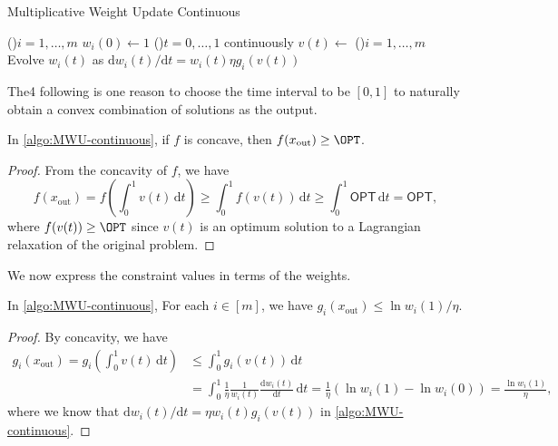 \begin{algorithm}[H]\label{algo:MWU-continuous}
	\DontPrintSemicolon{}
	\caption{Multiplicative Weight Update Continuous}
	\BlankLine

	\For(){\(i = 1, \dots , m\)}{
		\(w_i(0) \gets 1\)\;
	}
	\;
	\While(){\(t = 0, \dots , 1\) continuously}{
	\(v(t) \gets\)\;
	\For(){\(i = 1, \dots , m\)}{
		Evolve \(w_i(t)\) as \(\mathrm{d} w_i(t) / \mathrm{d} t = w_i(t) \eta g_i(v(t))\)\;
	}
	}
	\;
\end{algorithm}

The4 following is one reason to choose the time interval to be \([0, 1]\) to naturally obtain a convex combination of solutions as the output.

\begin{lemma}\label{lma:MWU-continuous-OPT}
	In \autoref{algo:MWU-continuous}, if \(f\) is concave, then \(f(x_{\text{out} }) \geq \OPT\).
\end{lemma}
\begin{proof}
	From the concavity of \(f\), we have
	\[
		f(x_{\text{out} })
		= f \left( \int_{0}^{1} v(t) \,\mathrm{d}t \right)
		\geq \int_{0}^{1} f(v(t)) \,\mathrm{d}t
		\geq \int_{0}^{1} \mathsf{OPT} \,\mathrm{d}t
		= \mathsf{OPT},
	\]
	where \(f(v(t)) \geq \OPT\) since \(v(t)\) is an optimum solution to a Lagrangian relaxation of the original problem.
\end{proof}

We now express the constraint values in terms of the weights.

\begin{lemma}\label{lma:MWU-continuous-constraint}
	In \autoref{algo:MWU-continuous}, For each \(i \in [m]\), we have \(g_i(x_{\text{out} }) \leq \ln w_i(1) / \eta \).
\end{lemma}
\begin{proof}
	By concavity, we have
	\[
		\begin{split}
			g_i(x_{\text{out} })
			= g_i \left( \int_{0}^{1} v(t) \,\mathrm{d}t \right)
			 & \leq \int_{0}^{1} g_i(v(t)) \,\mathrm{d}t                                                           \\
			 & = \int_{0}^{1} \frac{1}{\eta } \frac{1}{w_i(t)} \frac{\mathrm{d}w_i (t)}{\mathrm{d}t} \,\mathrm{d}t
			= \frac{1}{\eta } \left( \ln w_i(1) - \ln w_i(0) \right)
			= \frac{\ln w_i(1)}{\eta },
		\end{split}
	\]
	where we know that \(\mathrm{d} w_i(t) / \mathrm{d} t = \eta w_i(t) g_i(v(t))\) in \autoref{algo:MWU-continuous}.
\end{proof}


